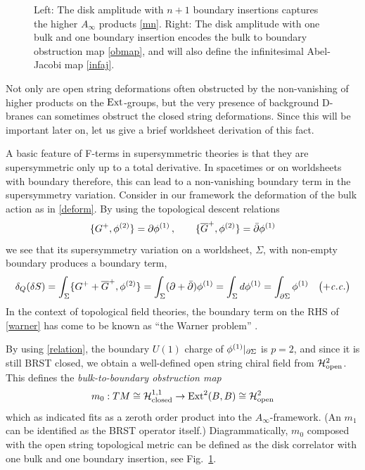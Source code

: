 \begin{figure}
\begin{center}
\caption{Left: The disk amplitude with $n+1$ boundary insertions captures 
the higher $A_\infty$ products \eqref{mn}. Right: The disk amplitude with 
one bulk and one boundary insertion encodes the bulk to boundary 
obstruction map \eqref{obmap}, and will also define the infinitesimal 
Abel-Jacobi map \eqref{infaj}.}
\label{obstruct}
\end{center}
\end{figure}

Not only are open string deformations often obstructed by the non-vanishing
of higher products on the ${\rm Ext}$-groups, but the very presence of
background D-branes can sometimes obstruct the closed string deformations. 
Since this will be important later on, let us give a brief worldsheet 
derivation of this fact.

A basic feature of F-terms in supersymmetric theories is that they are
supersymmetric only up to a total derivative. In spacetimes or on 
worldsheets with boundary therefore, this can lead to a non-vanishing
boundary term in the supersymmetry variation. Consider in our framework
the deformation of the bulk action as in \eqref{deform}. By using the
topological descent relations
\begin{equation}
\{G^+,\phi^{(2)}\} = \partial\phi^{(1)}\,,\qquad 
\{{\overline G}^+,\phi^{(2)}\} = \bar\partial\phi^{(1)}
\end{equation}
we see that its supersymmetry variation on a worldsheet, $\Sigma$, with 
non-empty boundary produces a boundary term,
\begin{equation}
\eqlabel{warner}
\delta_Q (\delta S) =  \int_\Sigma \{G^++\Gb^+,\phi^{(2)}\} =
\int_\Sigma (\del+\delbar)\phi^{(1)} = 
\int_\Sigma d\phi^{(1)} 
= \int_{\del\Sigma} \phi^{(1)} \quad \bigl(+ {\it c.c.}\bigr)
\end{equation}
In the context of topological field theories, the boundary term on the 
RHS of \eqref{warner} has come to be known as ``the Warner problem'' 
\cite{warner}.

By using \eqref{relation}, the boundary $U(1)$ charge of 
$\phi^{(1)}|_{\partial\Sigma}$ is $p=2$, and since it is still BRST closed,
we obtain a well-defined open string chiral field from ${\cal H}^2_{\rm open}$.
This defines the {\it bulk-to-boundary obstruction map}
\begin{equation}
\eqlabel{obmap}
m_0 : TM \cong \calh^{1,1}_{\rm closed} \to {\rm Ext}^2(B,B) \cong 
\calh^2_{\rm open}
\end{equation}
which as indicated fits as a zeroth order product into the 
$A_\infty$-framework. (An $m_1$ can be identified as the BRST
operator itself.) Diagrammatically, $m_0$ composed with the open 
string topological metric can be defined as the disk correlator with 
one bulk and one boundary insertion, see Fig.\ \ref{obstruct}.


